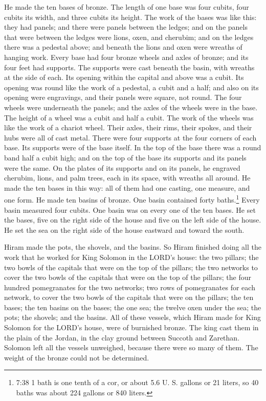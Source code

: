 \myverse{}He made the ten bases of bronze. The length of one base was four
cubits, four cubits its width, and three cubits its height.
\myverse{}The work of the bases was like this: they had panels; and there were panels
between the ledges;
\myverse{}and on the panels that were between the ledges were lions, oxen, and cherubim;
and on the ledges there was a pedestal above; and beneath the lions and oxen were wreaths of hanging work.
\myverse{}Every base had four bronze wheels and axles of bronze; and its four feet had
supports. The supports were cast beneath the basin, with wreaths at the side of each.
\myverse{}Its opening within the capital and above was a cubit. Its opening was round
like the work of a pedestal, a cubit and a half; and also on its opening were engravings, and their panels
were square, not round.
\myverse{}The four wheels were underneath the panels; and the axles of the wheels were
in the base. The height of a wheel was a cubit and half a cubit.
\myverse{}The work of the wheels was like the work of a chariot wheel. Their axles,
their rims, their spokes, and their hubs were all of cast metal.
\myverse{}There were four supports at the four corners of each base. Its supports were
of the base itself.
\myverse{}In the top of the base there was a round band half a cubit high; and on the
top of the base its supports and its panels were the same.
\myverse{}On the plates of its supports and on its panels, he engraved cherubim, lions,
and palm trees, each in its space, with wreaths all around.
\myverse{}He made the ten bases in this way: all of them had one casting, one measure,
and one form.
\myverse{}He made ten basins of bronze. One basin contained forty baths.\footnote{7:38 1 bath is one tenth of a cor, or about 5.6 U. S. gallons or 21 liters, so 40 baths was about
	224 gallons or 840 liters.} Every basin measured four cubits. One basin was on every one of the
ten bases.
\myverse{}He set the bases, five on the right side of the house and five on the left
side of the house. He set the sea on the right side of the house eastward and toward the south.

\myverse{}Hiram made the pots, the shovels, and the basins. So Hiram finished
doing all the work that he worked for King Solomon in the LORD’s house:
\myverse{}the two pillars; the two bowls of the capitals that were on the top of the
pillars; the two networks to cover the two bowls of the capitals that were on the top of the pillars;
\myverse{}the four hundred pomegranates for the two networks; two rows of pomegranates
for each network, to cover the two bowls of the capitals that were on the pillars;
\myverse{}the ten bases; the ten basins on the bases;
\myverse{}the one sea; the twelve oxen under the sea;
\myverse{}the pots; the shovels; and the basins. All of these vessels, which Hiram made
for King Solomon for the LORD’s house, were of burnished bronze.
\myverse{}The king cast them in the plain of the Jordan, in the clay ground between
Succoth and Zarethan.
\myverse{}Solomon left all the vessels unweighed, because there were so many of them.
The weight of the bronze could not be determined.


